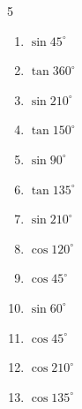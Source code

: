 \begin{multicols}{5}
\begin{enumerate}
  \item $\displaystyle \sin{45^\circ}$


  \item $\displaystyle \tan{360^\circ}$

        \phantom{$\displaystyle =0$}

  \item $\displaystyle \sin{210^\circ}$


  \item $\displaystyle \tan{150^\circ}$


  \item $\displaystyle \sin{90^\circ}$

        \phantom{$\displaystyle =1$}

  \item $\displaystyle \tan{135^\circ}$

        \phantom{$\displaystyle =-1$}

  \item $\displaystyle \sin{210^\circ}$


\columnbreak %

  \item $\displaystyle \cos{120^\circ}$


  \item $\displaystyle \cos{45^\circ}$


  \item $\displaystyle \sin{60^\circ}$


  \item $\displaystyle \cos{45^\circ}$


  \item $\displaystyle \cos{210^\circ}$


  \item $\displaystyle \cos{135^\circ}$


\end{enumerate}
\end{multicols}
